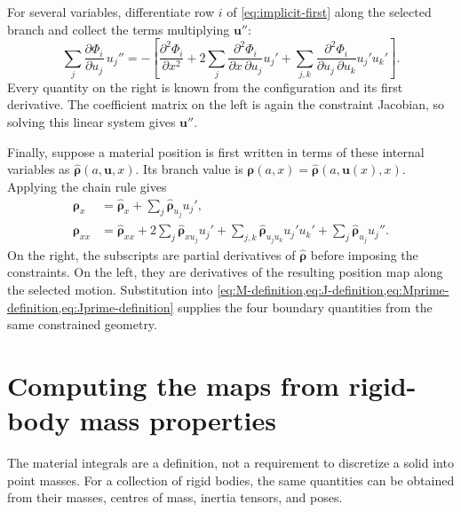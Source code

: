 \documentclass[11pt,letterpaper]{article}
\numberwithin{equation}{section}
\newcommand{\rhoo}{\bm\rho}
\begin{document}
For several variables, differentiate row $i$ of \cref{eq:implicit-first} along the selected branch and collect the terms multiplying $\bm u''$:
\begin{equation}
  \sum_j\frac{\partial\Phi_i}{\partial u_j}\,u_j''
   =-\left[
       \frac{\partial^2\Phi_i}{\partial x^2}
       +2\sum_j\frac{\partial^2\Phi_i}{\partial x\,\partial u_j}u_j'
       +\sum_{j,k}
         \frac{\partial^2\Phi_i}{\partial u_j\,\partial u_k}u_j'u_k'
     \right].
  \label{eq:implicit-second}
\end{equation}
Every quantity on the right is known from the configuration and its first derivative. The coefficient matrix on the left is again the constraint Jacobian, so solving this linear system gives $\bm u''$.

Finally, suppose a material position is first written in terms of these internal variables as $\widehat{\rhoo}(a,\bm u,x)$. Its branch value is $\rhoo(a,x)=\widehat{\rhoo}(a,\bm u(x),x)$. Applying the chain rule gives
\begin{align}
  \rhoo_x
    &=\widehat{\rhoo}_x+\sum_j\widehat{\rhoo}_{u_j}u_j',
      \label{eq:position-first}\\
  \rhoo_{xx}
    &=\widehat{\rhoo}_{xx}
      +2\sum_j\widehat{\rhoo}_{x u_j}u_j'
      +\sum_{j,k}\widehat{\rhoo}_{u_j u_k}u_j'u_k'
      +\sum_j\widehat{\rhoo}_{u_j}u_j''.
      \label{eq:position-second}
\end{align}
On the right, the subscripts are partial derivatives of $\widehat{\rhoo}$ before imposing the constraints. On the left, they are derivatives of the resulting position map along the selected motion. Substitution into \cref{eq:M-definition,eq:J-definition,eq:Mprime-definition,eq:Jprime-definition} supplies the four boundary quantities from the same constrained geometry.

\clearpage
\section{Computing the maps from rigid-body mass properties}
\label{app:rigid}
\par

The material integrals are a definition, not a requirement to discretize a solid into point masses. For a collection of rigid bodies, the same quantities can be obtained from their masses, centres of mass, inertia tensors, and poses.
\end{document}
